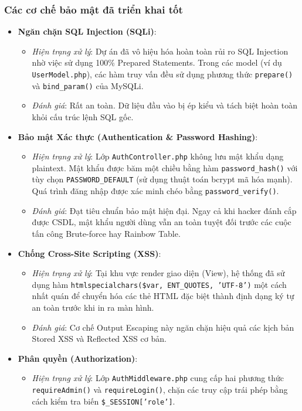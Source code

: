 \documentclass[pt = 12,a4paper]{article}
\begin{document}
\subsubsection{Các cơ chế bảo mật đã triển khai tốt}
\begin{itemize}
    \item \textbf{Ngăn chặn SQL Injection (SQLi)}: 
    \begin{itemize}
        \item \textit{Hiện trạng xử lý}: Dự án đã vô hiệu hóa hoàn toàn rủi ro SQL Injection nhờ việc sử dụng 100\% Prepared Statements. Trong các model (ví dụ \texttt{UserModel.php}), các hàm truy vấn đều sử dụng phương thức \texttt{prepare()} và \texttt{bind\_param()} của MySQLi.
        \item \textit{Đánh giá}: Rất an toàn. Dữ liệu đầu vào bị ép kiểu và tách biệt hoàn toàn khỏi cấu trúc lệnh SQL gốc.
    \end{itemize}

    \item \textbf{Bảo mật Xác thực (Authentication \& Password Hashing)}: 
    \begin{itemize}
        \item \textit{Hiện trạng xử lý}: Lớp \texttt{AuthController.php} không lưu mật khẩu dạng plaintext. Mật khẩu được băm một chiều bằng hàm \texttt{password\_hash()} với tùy chọn \texttt{PASSWORD\_DEFAULT} (sử dụng thuật toán bcrypt mã hóa mạnh). Quá trình đăng nhập được xác minh chéo bằng \texttt{password\_verify()}.
        \item \textit{Đánh giá}: Đạt tiêu chuẩn bảo mật hiện đại. Ngay cả khi hacker đánh cắp được CSDL, mật khẩu người dùng vẫn an toàn tuyệt đối trước các cuộc tấn công Brute-force hay Rainbow Table.
    \end{itemize}

    \item \textbf{Chống Cross-Site Scripting (XSS)}: 
    \begin{itemize}
        \item \textit{Hiện trạng xử lý}: Tại khu vực render giao diện (View), hệ thống đã sử dụng hàm \texttt{htmlspecialchars(\$var, ENT\_QUOTES, 'UTF-8')} một cách nhất quán để chuyển hóa các thẻ HTML đặc biệt thành định dạng ký tự an toàn trước khi in ra màn hình.
        \item \textit{Đánh giá}: Cơ chế Output Escaping này ngăn chặn hiệu quả các kịch bản Stored XSS và Reflected XSS cơ bản.
    \end{itemize}

    \item \textbf{Phân quyền (Authorization)}: 
    \begin{itemize}
        \item \textit{Hiện trạng xử lý}: Lớp \texttt{AuthMiddleware.php} cung cấp hai phương thức \texttt{requireAdmin()} và \texttt{requireLogin()}, chặn các truy cập trái phép bằng cách kiểm tra biến \texttt{\$\_SESSION['role']}.
    \end{itemize}
\end{itemize}
\end{document}
